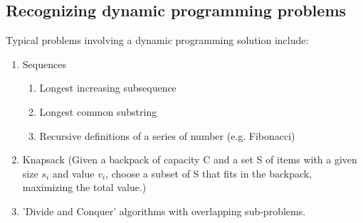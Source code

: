 \subsection{Recognizing dynamic programming problems}
Typical problems involving a dynamic programming solution include:
\begin{enumerate}
 \item Sequences
 \begin{enumerate}
  \item Longest increasing subsequence
  \item Longest common substring
  \item Recursive definitions of a series of number (e.g. Fibonacci)
 \end{enumerate}
 \item Knapsack (Given a backpack of capacity C and a set S of items with a given size $s_i$ and value $v_i$, choose a subset of S that fits in the backpack, maximizing the total value.)
 \item 'Divide and Conquer' algorithms with overlapping sub-problems.
\end{enumerate}
